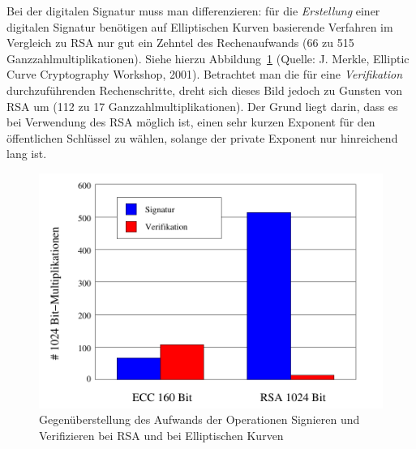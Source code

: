 \begin{refsegment}
Bei der digitalen Signatur muss man differenzieren: für die {\em
  Erstellung} einer digitalen Signatur benötigen auf Elliptischen
Kurven basierende Verfahren im Vergleich zu RSA nur gut ein Zehntel des
Rechenaufwands (66 zu 515 Ganzzahlmultiplikationen). Siehe hierzu
Abbildung~\ref{ThousandBitMultiplications} (Quelle: J.  Merkle,
Elliptic Curve Cryptography Workshop, 2001). Betrachtet man die für eine
{\em Verifikation} durchzuführenden Rechenschritte, dreht sich dieses Bild
jedoch zu Gunsten von RSA um (112 zu 17 Ganzzahlmultiplikationen). Der
Grund liegt darin, dass es bei Verwendung des RSA möglich ist, einen sehr
kurzen Exponent für den öffentlichen Schlüssel zu wählen, solange der
private Exponent nur hinreichend lang ist.

\begin{figure}[ht]
\begin{center}
\includegraphics[scale=0.7]{figures/ECCRSA}
\caption{Gegenüberstellung des Aufwands der Operationen Signieren und
         Verifizieren bei RSA und bei Elliptischen Kurven}
\label{ThousandBitMultiplications}
\end{center}
\end{figure}


\end{refsegment}
